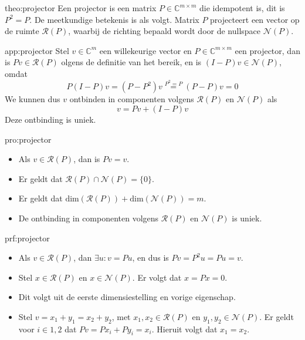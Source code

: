 \begin{theo}[Projector]{theo:projector}
    Een projector is een matrix $P \in \mathbb{C}^{m \times m}$ die idempotent is, dit is $P^2 = P$. De meetkundige betekenis is als volgt. Matrix $P$ projecteert een vector op de ruimte $\mathcal{R}(P)$, waarbij de richting bepaald wordt door de nullspace $\mathcal{N}(P)$. 
\end{theo}

\newpage

\begin{app}[Projector]{app:projector}
    Stel $v \in \mathbb{C}^m$ een willekeurige vector en $P \in \mathbb{C}^{m \times m}$ een projector, dan is $Pv \in \mathcal{R}(P)$ olgens de definitie van het bereik, en is $(I - P)v \in \mathcal{N}(P)$, omdat 
    \begin{equation*}
        P(I - P)v = (P - P^2)v \overset{P^2 = P}{=} (P-P)v = 0
    \end{equation*}
    We kunnen dus $v$ ontbinden in componenten volgens $\mathcal{R}(P)$ en $\mathcal{N}(P)$ als
    \begin{equation*}
        v = Pv + (I - P)v
    \end{equation*}
    Deze ontbinding is uniek.
\end{app}

\begin{pro}[Projector]{pro:projector}
    \begin{itemize}
        \item Als $v \in \mathcal{R}(P)$, dan is $Pv = v$.
        \item Er geldt dat $\mathcal{R}(P) \cap \mathcal{N}(P) = \{0\}$.
        \item Er geldt dat $\text{dim}(\mathcal{R}(P)) + \text{dim}(\mathcal{N}(P)) = m$.
        \item De ontbinding in componenten volgens $\mathcal{R}(P)$ en $\mathcal{N}(P)$ is uniek.
    \end{itemize}
\end{pro}

\begin{prf}[Projector]{prf:projector}
    \begin{itemize}
        \item Als $v \in \mathcal{R}(P)$, dan $\exists u: v = Pu$, en dus is $Pv = P^2u = Pu = v$.
        \item Stel $x \in \mathcal{R}(P)$ en $x \in \mathcal{N}(P)$. Er volgt dat $x = Px = 0$.
        \item Dit volgt uit de eerste dimensiestelling en vorige eigenschap.
        \item Stel $v = x_1 + y_1 = x_2 + y_2$, met $x_1, x_2 \in \mathcal{R}(P)$ en $y_1, y_2 \in \mathcal{N}(P)$. Er geldt voor $i \in {1,2}$ dat $Pv = Px_i + Py_i = x_i$. Hieruit volgt dat $x_1 = x_2$.
    \end{itemize}
\end{prf}

